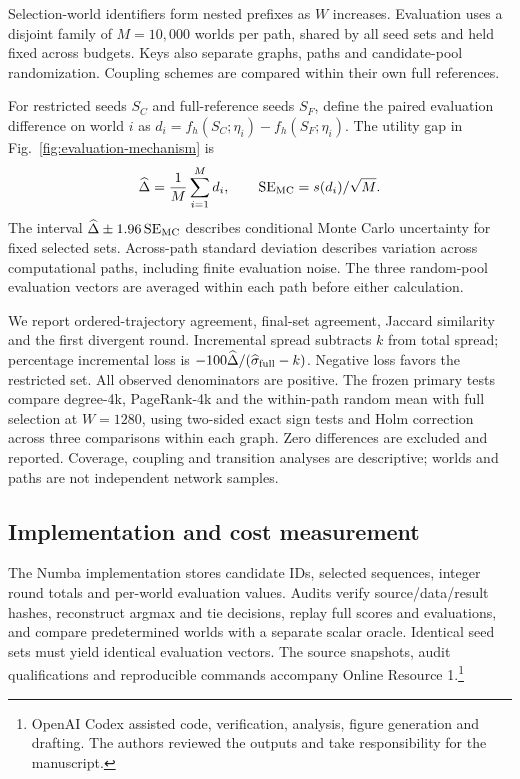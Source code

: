 \documentclass[smallextended]{svjour3}
\begin{document}
Selection-world identifiers form nested prefixes as $W$ increases. Evaluation uses a disjoint family of $M=10,000$ worlds per path, shared by all seed sets and held fixed across budgets. Keys also separate graphs, paths and candidate-pool randomization. Coupling schemes are compared within their own full references.

For restricted seeds $S_C$ and full-reference seeds $S_F$, define the paired evaluation difference on world $i$ as $d_i=f_h(S_C;\eta_i)-f_h(S_F;\eta_i)$. The utility gap in Fig.~\ref{fig:evaluation-mechanism} is
\begin{equation}
\widehat\Delta=\frac{1}{M}\sum_{i=1}^{M}d_i,
\qquad \operatorname{SE}_{\rm MC}=s(d_i)/\sqrt M.
\end{equation}
The interval $\widehat\Delta\pm1.96\operatorname{SE}_{\rm MC}$ describes conditional Monte Carlo uncertainty for fixed selected sets. Across-path standard deviation describes variation across computational paths, including finite evaluation noise. The three random-pool evaluation vectors are averaged within each path before either calculation.

We report ordered-trajectory agreement, final-set agreement, Jaccard similarity and the first divergent round. Incremental spread subtracts $k$ from total spread; percentage incremental loss is $-100\widehat\Delta/(\widehat\sigma_{\rm full}-k)$. Negative loss favors the restricted set. All observed denominators are positive. The frozen primary tests compare degree-4k, PageRank-4k and the within-path random mean with full selection at $W=1280$, using two-sided exact sign tests and Holm correction across three comparisons within each graph. Zero differences are excluded and reported. Coverage, coupling and transition analyses are descriptive; worlds and paths are not independent network samples.

\subsection{Implementation and cost measurement}
The Numba implementation stores candidate IDs, selected sequences, integer round totals and per-world evaluation values. Audits verify source/data/result hashes, reconstruct argmax and tie decisions, replay full scores and evaluations, and compare predetermined worlds with a separate scalar oracle. Identical seed sets must yield identical evaluation vectors. The source snapshots, audit qualifications and reproducible commands accompany Online Resource 1.\footnote{OpenAI Codex assisted code, verification, analysis, figure generation and drafting. The authors reviewed the outputs and take responsibility for the manuscript.}
\end{document}

